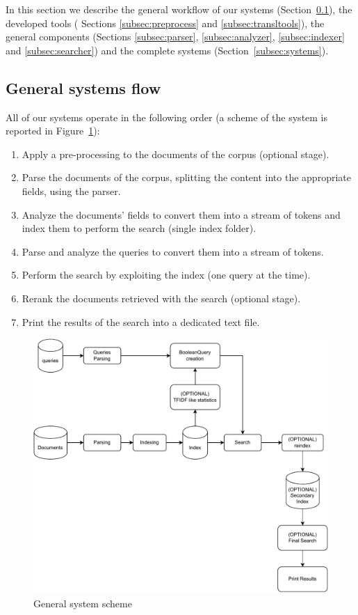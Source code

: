 \par
In this section we describe the general workflow of our systems (Section~\ref{subsec:genflow}), the developed tools ( Sections \ref{subsec:preprocess} and \ref{subsec:transltools}), the general components (Sections \ref{subsec:parser}, \ref{subsec:analyzer}, \ref{subsec:indexer} and \ref{subsec:searcher}) and the complete systems (Section~\ref{subsec:systems}).

\subsection{General systems flow}
\label{subsec:genflow}
All of our systems operate in the following order (a scheme of the system is reported in Figure~\ref{fig:overallsys}):
\begin{enumerate}
	\item Apply a pre-processing to the documents of the corpus (optional stage).
	\item Parse the documents of the corpus, splitting the content into the appropriate fields, using the parser.
	\item Analyze the documents' fields to convert them into a stream of tokens and index them to perform the search (single index folder).
	\item Parse and analyze the queries to convert them into a stream of tokens.
	\item Perform the search by exploiting the index (one query at the time).
	\item Rerank the documents retrieved with the search (optional stage).
	\item Print the results of the search into a dedicated text file.
\end{enumerate}

\begin{figure}[tb]
    \centering
    \includegraphics[scale=0.8]{figure/overallsystem.pdf}
    \caption{General system scheme}
    \label{fig:overallsys}
\end{figure}

